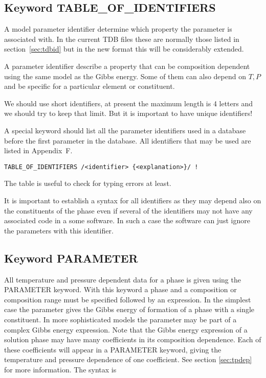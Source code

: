 \documentclass[12pt]{article}
\begin{document}
\subsection{Keyword TABLE\_OF\_IDENTIFIERS}\label{sec:paramid}

A model parameter identifier determine which property the parameter is
associated with.  In the current TDB files these are normally those
listed in section~\ref{sec:tdbid} but in the new format this will be
considerably extended.

A parameter identifier describe a property that can be composition
dependent using the same model as the Gibbs energy.  Some of them can
also depend on $T, P$ and be specific for a particular element or
constituent.  

We should use short identifiers, at present the maximum length is 4
letters and we should try to keep that limit.  But it is important to
have unique identifiers!

A special keyword should list all the parameter identifiers used in a
database before the first parameter in the database.  All identifiers
that may be used are listed in Appendix~F.
\begin{verbatim}
TABLE_OF_IDENTIFIERS /<identifier> {<explanation>}/ !
\end{verbatim}

The table is useful to check for typing errors at least.  

It is important to establish a syntax for all identifiers as they may
depend also on the constituents of the phase even if several of the
identifiers may not have any associated code in a some software.  In
such a case the software can just ignore the parameters with this
identifier.

\subsection{Keyword PARAMETER}\label{sec:parameter}

All temperature and pressure dependent data for a phase is given using
the PARAMETER keyword.  With this keyword a phase and a composition or
composition range must be specified followed by an expression.  In the
simplest case the parameter gives the Gibbs energy of formation of a
phase with a single constituent.  In more sophisticated models the
parameter may be part of a complex Gibbs energy expression.  Note that
the Gibbs energy expression of a solution phase may have many
coefficients in its composition dependence.  Each of these
coefficients will appear in a PARAMETER keyword, giving the
temperature and pressure dependence of one coefficient.  See section
\ref{sec:tpdep} for more information.  The syntax is
\end{document}
